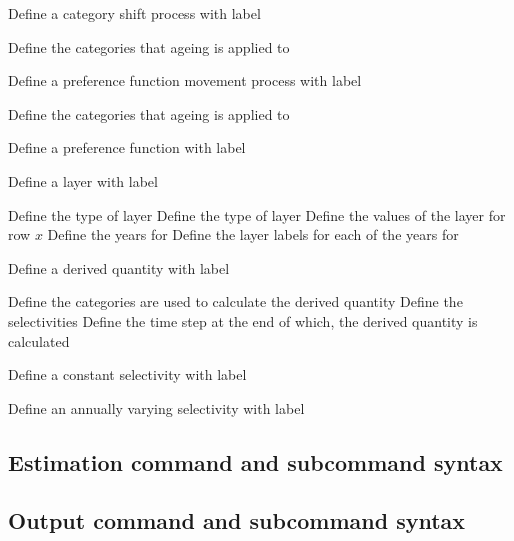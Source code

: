 \par {} {Define a category shift process with label}\par \par
{} {Define the categories that ageing is applied to}
\par {} {Define a preference function movement process with label}\par \par
{} {Define the categories that ageing is applied to}
\par {} {Define a preference function with label}\par \par
\par {} {Define a layer with label}\par \par
{} {Define the type of layer}
 {Define the type of layer}
 {Define the values of the layer for row $x$}
 {Define the years for }
 {Define the layer labels for each of the years for }
\par {} {Define a derived quantity with label}\par \par
{} {Define the categories are used to calculate the derived quantity}
 {Define the selectivities}
 {Define the time step at the end of which, the derived quantity is calculated}
\par {} {Define a constant selectivity with label}\par \par
\par {} {Define an annually varying selectivity with label}\par \par
\subsection{Estimation command and subcommand syntax}
\subsection{Output command and subcommand syntax}
